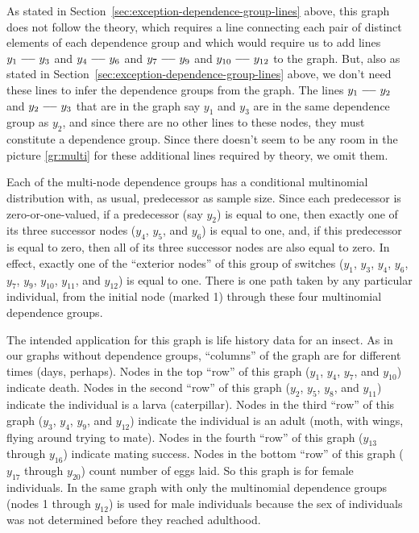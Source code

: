 As stated in Section~\ref{sec:exception-dependence-group-lines} above,
this graph does not follow the theory, which requires a line connecting
each pair of distinct elements of each dependence group and which would
require us to add lines $y_1 \myline y_3$ and $y_4 \myline y_6$
and $y_7 \myline y_9$ and $y_{10} \myline y_{12}$ to the graph.
But, also as stated in Section~\ref{sec:exception-dependence-group-lines}
above, we don't need these lines to infer the dependence groups from the
graph.  The lines $y_1 \myline y_2$ and $y_2 \myline y_3$ that are in the
graph say $y_1$ and $y_3$ are in the same dependence group as $y_2$,
and since there are no other lines to these nodes, they must constitute
a dependence group.  Since there doesn't seem to be any room in
the picture \eqref{gr:multi} for these additional lines required by theory,
we omit them.

Each of the multi-node dependence groups has a conditional multinomial
distribution with, as usual, predecessor as sample size.  Since each
predecessor is zero-or-one-valued, if a predecessor (say $y_2$) is
equal to one, then exactly one of its three successor nodes ($y_4$, $y_5$,
and $y_6$) is equal to one, and, if this predecessor
is equal to zero, then all of its three successor nodes are also equal to zero.
In effect, exactly one of the ``exterior nodes'' of this group of switches
($y_1$, $y_3$, $y_4$, $y_6$, $y_7$, $y_9$, $y_{10}$, $y_{11}$, and $y_{12}$)
is equal to one.  There is one path taken by any particular individual,
from the initial node (marked 1) through these four multinomial dependence
groups.

The intended application for this graph \citep[as in][]{aster-hornworm}
is life history
data for an insect.  As in our graphs without dependence groups,
``columns'' of the graph are for different
times (days, perhaps).
Nodes in the top ``row'' of this graph ($y_1$, $y_4$, $y_7$, and $y_{10}$)
indicate death.
Nodes in the second ``row'' of this graph ($y_2$, $y_5$, $y_8$, and $y_{11}$)
indicate the individual is a larva (caterpillar).
Nodes in the third ``row'' of this graph ($y_3$, $y_4$, $y_9$, and $y_{12}$)
indicate the individual is an adult (moth, with wings, flying around trying
to mate).
Nodes in the fourth ``row'' of this graph ($y_{13}$ through $y_{16}$)
indicate mating success.
Nodes in the bottom ``row'' of this graph ($y_{17}$ through $y_{20}$)
count number of eggs laid.  So this graph is for female individuals.
In \citet{aster-hornworm} the same graph with only the multinomial dependence
groups (nodes 1 through $y_{12}$) is used for male individuals because
the sex of individuals was not determined before they reached adulthood.

